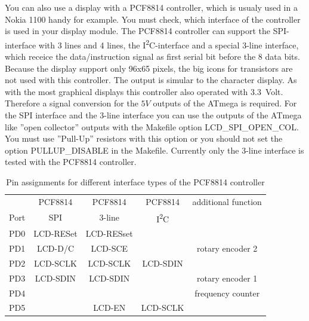 You can also use a display with a PCF8814 controller, which is usualy used in a Nokia 1100 handy for example.
You must check, which interface of the controller is used in your display module.
The PCF8814 controller can support the SPI-interface with 3 lines and 4 lines,
the I\textsuperscript{2}C-interface and a special 3-line interface, which receice
the data/instruction signal as first serial bit before the 8 data bits.
Because the display support only 96x65 pixels, the big icons for transistors are not
used with this controller. The output is simular to the character display.
As with the most graphical displays this controller also operated with 3.3~Volt.
Therefore a signal conversion for the \(5V\) outputs of the ATmega is required.
For the SPI interface and the 3-line interface you can use the outputs of the ATmega
like ''open collector'' outputs with the Makefile option LCD\_SPI\_OPEN\_COL.
You must use ''Pull-Up'' resistors with this option or you should not set
the option PULLUP\_DISABLE in the Makefile.
Currently only the 3-line interface is tested with the PCF8814 controller.

\begin{table}[H]
  \begin{center}
    \begin{tabular}{| c || c | c | c | c |}
    \hline
           &  PCF8814    & PCF8814        & PCF8814     & additional function \\
      Port &    SPI      & 3-line         &   I\textsuperscript{2}C      & \\
    \hline
    \hline
    PD0    &   LCD-RESet  & LCD-RESset       &            & \\
    \hline
    PD1    &   LCD-D/C   & LCD-SCE        &             & rotary encoder 2 \\
    \hline
    PD2    &   LCD-SCLK  & LCD-SCLK       &  LCD-SDIN   & \\
    \hline
    PD3    &   LCD-SDIN  & LCD-SDIN       &             & rotary encoder 1 \\
    \hline
    PD4    &             &                &             & frequency counter \\
    \hline
    PD5    &             & LCD-EN         &   LCD-SCLK  & \\
    \hline
    \end{tabular}
  \end{center}
  \caption{Pin assignments for different interface types of the PCF8814 controller}
  \label{tab:PCF8814-con}
\end{table}

